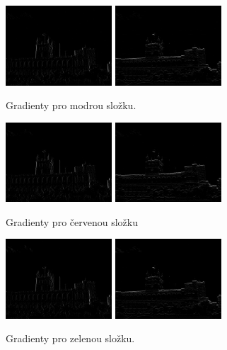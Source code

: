 \documentclass{report}
\begin{document}
\begin{figure}[H]
		\centering
		\includegraphics[width=150px]{./img/gradient_b_x.jpg}	
		\includegraphics[width=150px]{./img/gradient_b_y.jpg}	
		\caption{Gradienty pro modrou složku.}
\end{figure}
\begin{figure}[H]
		\centering
		\includegraphics[width=150px]{./img/gradient_g_x.jpg}	
		\includegraphics[width=150px]{./img/gradient_g_y.jpg}	
		\caption{Gradienty pro červenou složku}
\end{figure}
\begin{figure}[H]
		\centering
		\includegraphics[width=150px]{./img/gradient_r_x.jpg}	
		\includegraphics[width=150px]{./img/gradient_r_y.jpg}	
		\caption{Gradienty pro zelenou složku.}
\end{figure}
\end{document}
